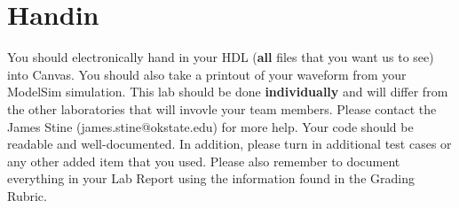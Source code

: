 \documentclass{article}
\begin{document}
\section{Handin}

You should electronically hand in your HDL (\textbf{all} files that you want
us to see) into Canvas.
You should also take a printout of your waveform 
from your ModelSim simulation.  This lab should be done \textbf{individually}
and will differ from the other laboratories that will invovle your
team members. 
Please contact
the James Stine (james.stine@okstate.edu) 
for more help.  Your
code should be
readable and well-documented. In addition, please turn in additional
test cases or any other added item that you used. 
Please also remember to document everything in your Lab Report using
the information found in the Grading Rubric.



\end{document}
